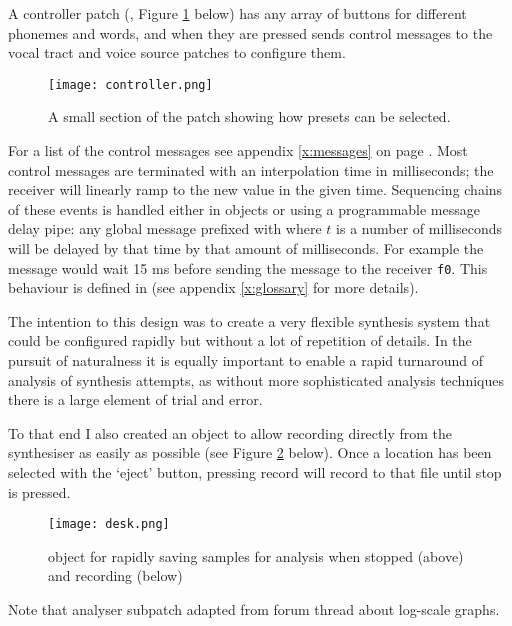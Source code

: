 A controller patch (, Figure \ref{fig:controller} below) has any array of buttons for different phonemes and words, and when they are pressed sends control messages to the vocal tract and voice source patches to configure them.
%
\begin{figure}[H] 
	\centering
	\texttt{[image: controller.png]}
	\caption{A small section of the  patch showing how presets can be selected.}
	\label{fig:controller}
\end{figure}
%
For a list of the control messages see appendix \ref{x:messages} on page \pageref{x:messages}. Most control messages are terminated with an interpolation time in milliseconds; the receiver will linearly ramp to the new value in the given time. Sequencing chains of these events is handled either in  objects or using a programmable message delay pipe: any global message prefixed with  where $t$ is a number of milliseconds will be delayed by that time by that amount of milliseconds. For example the message  would wait 15 ms before sending the message  to the receiver \texttt{f0}. This behaviour is defined in  (see appendix \ref{x:glossary} for more details).

The intention to this design was to create a very flexible synthesis system that could be configured rapidly but without a lot of repetition of details. In the pursuit of naturalness it is equally important to enable a rapid turnaround of analysis of synthesis attempts, as without more sophisticated analysis techniques there is a large element of trial and error.

To that end I also created an object to allow recording directly from the synthesiser as easily as possible (see Figure \ref{fig:desk} below). Once a location has been selected with the `eject' button, pressing record will record to that file until stop is pressed.
%
\begin{figure}[H]
	\centering
	\texttt{[image: desk.png]}
	\caption{ object for rapidly saving samples for analysis when stopped (above) and recording (below)}
	\label{fig:desk}
\end{figure}
%

Note that analyser subpatch adapted from forum thread about log-scale graphs.